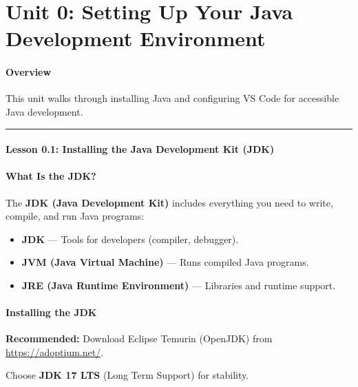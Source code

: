 \documentclass[
  justified,
  openright,
]{tufte-book}
\let\subsection\paragraph
\let\paragraph\paragraph
\let\subsection\paragraph
\let\paragraph\paragraph
\providecommand{\tightlist}{%
  \setlength{\itemsep}{0pt}\setlength{\parskip}{0pt}}
\begin{document}
\newpage

\section{Unit 0: Setting Up Your Java Development
Environment}\label{unit-0-setting-up-your-java-development-environment}

\subsection{Overview}\label{overview-14}

This unit walks through installing Java and configuring VS Code for
accessible Java development.

\begin{center}\rule{0.5\linewidth}{0.5pt}\end{center}

\subsection{Lesson 0.1: Installing the Java Development Kit
(JDK)}\label{lesson-0.1-installing-the-java-development-kit-jdk}

\subsection{What Is the JDK?}\label{what-is-the-jdk}

The \textbf{JDK (Java Development Kit)} includes everything you need to
write, compile, and run Java programs:

\begin{itemize}
\tightlist
\item
  \textbf{JDK} --- Tools for developers (compiler, debugger).
\item
  \textbf{JVM (Java Virtual Machine)} --- Runs compiled Java programs.
\item
  \textbf{JRE (Java Runtime Environment)} --- Libraries and runtime
  support.
\end{itemize}

\subsection{Installing the JDK}\label{installing-the-jdk}

\textbf{Recommended:} Download Eclipse Temurin (OpenJDK) from
\url{https://adoptium.net/}.

Choose \textbf{JDK 17 LTS} (Long Term Support) for stability.
\end{document}
